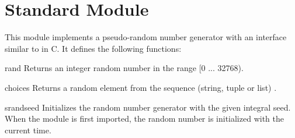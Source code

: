 \section{Standard Module }

 This module implements a pseudo-random number
generator with an interface similar to  in C.  It defines
the following functions:

\renewcommand{\indexsubitem}{(in module rand)}
\begin{funcdesc}{rand}{}
Returns an integer random number in the range [0 ... 32768).
\end{funcdesc}

\begin{funcdesc}{choice}{s}
Returns a random element from the sequence (string, tuple or list)
.
\end{funcdesc}

\begin{funcdesc}{srand}{seed}
Initializes the random number generator with the given integral seed.
When the module is first imported, the random number is initialized with
the current time.
\end{funcdesc}
